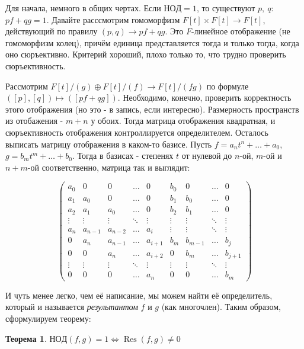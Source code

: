 \documentclass[a4paper,100pt]{article}
\theoremstyle{indented}
\newtheorem{theorem}{Теорема}
\theoremstyle{definition}
\theoremstyle{remark}
\DeclareMathOperator{\Res}{Res}
\begin{document}
Для начала, немного в общих чертах. Если $НОД=1$, то существуют $p, \: q$: $pf+qg=1$. Давайте расссмотрим гомоморфизм $F[t]\times F[t]\rightarrow F[t]$, действующий по правилу $(p, q)\rightarrow pf+qg$. Это $F$-линейное отображение (не гомоморфизм колец), причём единица представляется тогда и только тогда, когда оно сюръективно. Критерий хороший, плохо только то, что трудно проверить сюръективность. \ 

Рассмотрим $F[t]/(g)\oplus F[t]/(f)\rightarrow F[t]/(fg)$ по формуле $([p], [q])\mapsto ([pf+qg])$. Необходимо, конечно, проверить корректность этого отображения (но это - в запись, если интересно). Размерность пространств из отобажения - $m+n$ у обоих. Тогда матрица отображения квадратная, и сюръективность отображения контроллируется определителем. Осталось выписать матрицу отображения в каком-то базисе. Пусть $f=a_nt^n+\ldots+a_0$, $g=b_mt^m+\ldots+b_0$. Тогда в базисах - степенях $t$ от нулевой до $n$-ой, $m$-ой и $n+m$-ой соответственно, матрица так и выглядит:

\begin{equation*}
    \begin{pmatrix}
        a_0 & 0 & 0 & \ldots & 0 & b_0 & 0 & \ldots & 0 \\
        a_1 & a_0 & 0 & \ldots & 0 & b_1 & b_0 & \ldots & 0 \\
        a_2 & a_1 & a_0 & \ldots & 0 & b_2 & b_1 & \ldots & 0 \\
        \vdots & \vdots & \vdots & \ddots & \vdots & \vdots & \vdots & \ddots & \vdots \\
        a_n & a_{n-1} & a_{n-2} & \ldots & a_i & \vdots & \vdots & \ddots & \vdots \\
        0 & a_n & a_{n-1} & \ldots & a_{i+1} & b_m & b_{m-1} & \ldots & b_j \\
        0 & 0 & a_n & \ldots & a_{i+2} & 0 & b_m & \ldots & b_{j+1} \\
        \vdots & \vdots & \vdots & \ddots & \vdots & \vdots & \vdots & \ddots & \vdots \\
        0 & 0 & 0 & \ldots & a_n & 0 & 0 & \ldots & b_m
    \end{pmatrix}
\end{equation*}

И чуть менее легко, чем её написание, мы можем найти её определитель, который и называется \textit{результантом} $f$ и $g$ (как многочлен). Таким образом, сформулируем теорему: \\ 

\begin{theorem}
    $НОД(f, g)=1\Leftrightarrow \Res (f, g)\neq 0$
\end{theorem}
\end{document}
